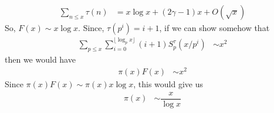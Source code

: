 \documentclass{article}
\theoremstyle{definition}
\begin{document}
		\begin{align*}
			\sum_{n\leq x}\tau(n)
				& = x\log{x}+(2\gamma-1)x+O(\sqrt{x})
		\end{align*}
	So, $F(x)\sim x\log{x}$. Since, $\tau(p^{i})=i+1$, if we can show somehow that
		\begin{align*}
			\sum_{p\leq x}\sum_{i=0}^{\lfloor\log_{p}{x}\rfloor}(i+1)S_{p}^{\tau}(x/p^{i})
				& \sim x^{2}
		\end{align*}
	then we would have
		\begin{align*}
			\pi(x)F(x)
				& \sim x^{2}
		\end{align*}
	Since $\pi(x)F(x)\sim \pi(x)x\log{x}$, this would give us
		\begin{align*}
			\pi(x)
				& \sim\dfrac{x}{\log{x}}
		\end{align*}
\end{document}
